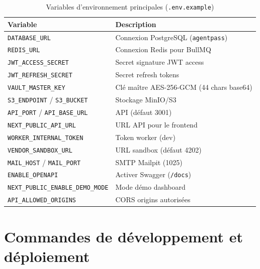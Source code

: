\begin{table}[H]
\centering
\caption{Variables d'environnement principales (\texttt{.env.example})}
\label{tab:env}
\small
\begin{tabularx}{\textwidth}{@{}p{4.8cm}X@{}}
\toprule
\textbf{Variable} & \textbf{Description} \\
\midrule
\rowcolor{rowgray}
\texttt{DATABASE\_URL} & Connexion PostgreSQL (\texttt{agentpass}) \\
\texttt{REDIS\_URL} & Connexion Redis pour BullMQ \\
\rowcolor{rowgray}
\texttt{JWT\_ACCESS\_SECRET} & Secret signature JWT access \\
\texttt{JWT\_REFRESH\_SECRET} & Secret refresh tokens \\
\rowcolor{rowgray}
\texttt{VAULT\_MASTER\_KEY} & Clé maître AES-256-GCM (44 chars base64) \\
\texttt{S3\_ENDPOINT} / \texttt{S3\_BUCKET} & Stockage MinIO/S3 \\
\rowcolor{rowgray}
\texttt{API\_PORT} / \texttt{API\_BASE\_URL} & API (défaut 3001) \\
\texttt{NEXT\_PUBLIC\_API\_URL} & URL API pour le frontend \\
\rowcolor{rowgray}
\texttt{WORKER\_INTERNAL\_TOKEN} & Token worker (dev) \\
\texttt{VENDOR\_SANDBOX\_URL} & URL sandbox (défaut 4202) \\
\rowcolor{rowgray}
\texttt{MAIL\_HOST} / \texttt{MAIL\_PORT} & SMTP Mailpit (1025) \\
\texttt{ENABLE\_OPENAPI} & Activer Swagger (\texttt{/docs}) \\
\rowcolor{rowgray}
\texttt{NEXT\_PUBLIC\_ENABLE\_DEMO\_MODE} & Mode démo dashboard \\
\texttt{API\_ALLOWED\_ORIGINS} & CORS origins autorisées \\
\bottomrule
\end{tabularx}
\end{table}

\chapter{Commandes de développement et déploiement}

